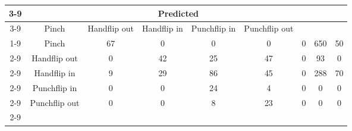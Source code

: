 \documentclass{standalone}
\begin{document}
 
 \begin{tabular}{|c |c |c |c |c |c |c |c |c |}
\cline{3-9}\multicolumn{2}{c|}{} & \multicolumn{7}{c|}{Predicted} \\ 
\cline{3-9} \multicolumn{2}{c |}{ } & Pinch & Handflip out & Handflip in & Punchflip in & Punchflip out\\ 
\cline{1-9}\multirow{7}{*}{\rotatebox[origin=c]{90}{Actual}} & Pinch & 67 & 0 & 0 & 0 & 0 & 650 & 50\\ 
 \cline{2-9} & Handflip out & 0 & 42 & 25 & 47 & 0 & 93 & 0\\ 
 \cline{2-9} & Handflip in & 9 & 29 & 86 & 45 & 0 & 288 & 70\\ 
 \cline{2-9} & Punchflip in & 0 & 0 & 24 & 4 & 0 & 0 & 0\\ 
 \cline{2-9} & Punchflip out & 0 & 0 & 8 & 23 & 0 & 0 & 0\\ 
 \cline{2-9}\hline \end{tabular}
 
\end{document}
